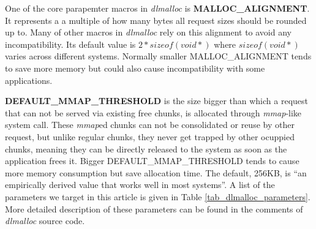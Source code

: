 One of the core parapemter macros in \emph{dlmalloc}  is \textbf{MALLOC\_ALIGNMENT}. It represents a a multiple of how many bytes all request sizes should be rounded up to. Many of other macros in \emph{dlmalloc} rely on this alignment to avoid any incompatibility. Its default value is $2*sizeof(void*)$ where $sizeof(void*)$ varies across different systems. Normally smaller MALLOC\_ALIGNMENT tends to save more memory but could also cause incompatibility with some applications. 



\textbf{DEFAULT\_MMAP\_THRESHOLD} is the size bigger than which a request that can not be served via existing free chunks, is allocated through \emph{mmap}-like system call. These \emph{mmap}ed chunks can not be consolidated or reuse by other request, but unlike regular chunks, they never get trapped by other ocuppied chunks, meaning they can be directly released to the system as soon as the application frees it. Bigger DEFAULT\_MMAP\_THRESHOLD tends to cause more memory consumption but save allocation time. The default, 256KB, is ``an empirically derived value that works well in most systems''. A list of the parameters we target in this article is given in Table \ref{tab_dlmalloc_parameters}. More detailed description of these parameters can be found in the comments of \emph{dlmalloc} source code.


